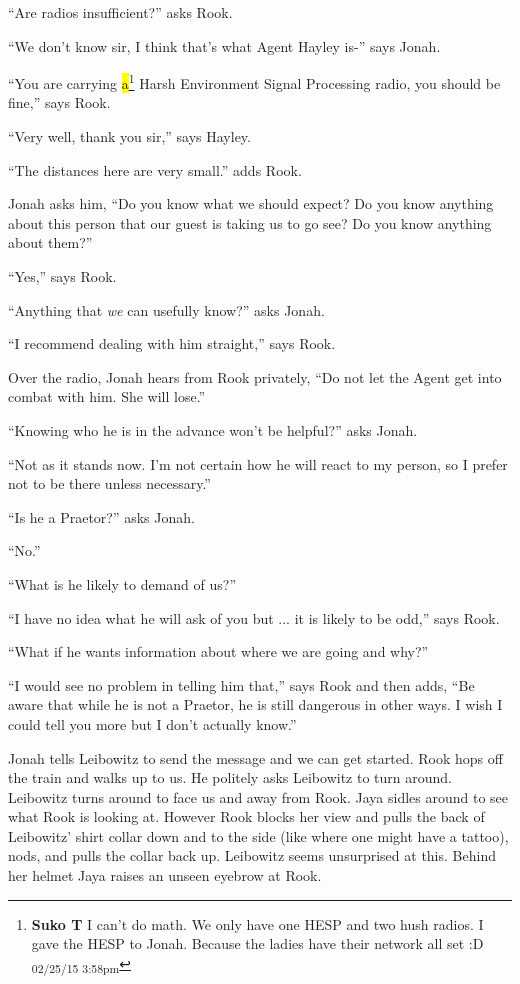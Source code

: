 ``Are radios insufficient?'' asks Rook.

``We don't know sir, I think that's what Agent Hayley is-'' says Jonah.

``You are carrying \hl{a}\footnote{\textbf{Suko T }I can't do math.  We only have one HESP and two hush radios.  I gave the HESP to Jonah.  Because the ladies have their network all set :D \textsubscript{02/25/15 3:58pm}} Harsh Environment Signal Processing radio, you should be fine,'' says Rook.

``Very well, thank you sir,'' says Hayley.

``The distances here are very small.'' adds Rook.



Jonah asks him, ``Do you know what we should expect?  Do you know anything about this person that our guest is taking us to go see?  Do you know anything about them?''

``Yes,'' says Rook.

``Anything that \textit{we} can usefully know?'' asks Jonah.

``I recommend dealing with him straight,'' says Rook.

Over the radio, Jonah hears from Rook privately, ``Do not let the Agent get into combat with him.  She will lose.''

``Knowing who he is in the advance won't be helpful?'' asks Jonah.

``Not as it stands now.  I'm not certain how he will react to my person, so I prefer not to be there unless necessary.''

``Is he a Praetor?'' asks Jonah.

``No.''

``What is he likely to demand of us?''

``I have no idea what he will ask of you but ... it is likely to be odd,'' says Rook.

``What if he wants information about where we are going and why?''

``I would see no problem in telling him that,'' says Rook and then adds, ``Be aware that while he is not a Praetor, he is still dangerous in other ways.  I wish I could tell you more but I don't actually know.''



Jonah tells Leibowitz to send the message and we can get started.  Rook hops off the train and walks up to us.  He politely asks Leibowitz to turn around.  Leibowitz turns around to face us and away from Rook.  Jaya sidles around to see what Rook is looking at.  However Rook blocks her view and pulls the back of Leibowitz' shirt collar down and to the side (like where one might have a tattoo), nods, and pulls the collar back up.  Leibowitz seems unsurprised at this.  Behind her helmet Jaya raises an unseen eyebrow at Rook.



